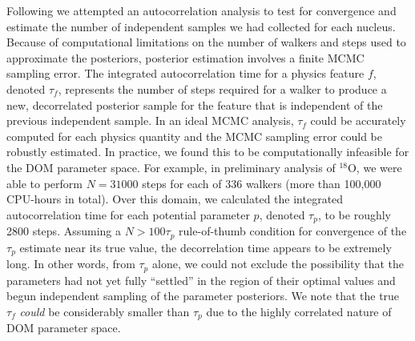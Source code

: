 \documentclass[twocolumn,secnumarabic,amssymb, nobibnotes, aps, prl,
superscriptaddress, nobalancelastpage, floatfix]{revtex4}
\newcommand{\oEight}{\ensuremath{^{18}}O}
\begin{document}
Following \cite{Foreman-Mackey2013} we attempted an
autocorrelation analysis to test for convergence
and estimate the number of independent samples we had collected for each nucleus.
Because of computational limitations on the number of walkers and steps used to approximate
the posteriors, posterior estimation involves a finite MCMC sampling error.
The integrated autocorrelation time for a physics feature $f$, denoted $\tau_{f}$, represents
the number of steps required for a walker to produce a new, decorrelated posterior sample for the
feature that is independent of the previous independent sample. In an ideal MCMC analysis, $\tau_{f}$ could be
accurately computed for each physics quantity and the MCMC sampling error could be robustly estimated.
In practice, we found this to be computationally infeasible
for the DOM parameter space. For example, in preliminary analysis of \oEight, we were
able to perform $N=31000$ steps for each of 336 walkers (more than 100,000
CPU-hours in total). Over this domain, we calculated the
integrated autocorrelation time for each potential parameter $p$, denoted $\tau_{p}$, 
to be roughly 2800 steps. Assuming a $N > 100\tau_{p}$ rule-of-thumb condition for convergence of the
$\tau_{p}$ estimate near its true value, the decorrelation time appears to be extremely
long. In other words, from $\tau_{p}$ alone, we could not exclude the
possibility that the parameters had not yet fully ``settled'' in the region of their
optimal values and begun independent sampling of the parameter posteriors. We note that the true
$\tau_{f}$ \textit{could} be considerably smaller than $\tau_{p}$ due to the highly correlated
nature of DOM parameter space.
\end{document}
